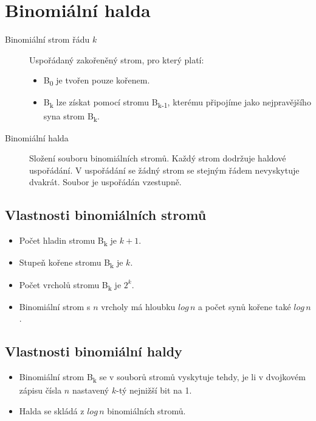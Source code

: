 \section{Binomiální halda}

  \begin{description}
    \item[Binomiální strom řádu $k$] Uspořádaný zakořeněný strom, pro který platí:
    \begin{itemize}
      \item B\textsubscript{0} je tvořen pouze kořenem.
      \item B\textsubscript{k} lze získat pomocí stromu B\textsubscript{k-1}, kterému připojíme jako nejpravějšího syna strom B\textsubscript{k}.
    \end{itemize}
    \item[Binomiální halda] Složení souboru binomiálních stromů. Každý strom dodržuje haldové uspořádání. V uspořádání se žádný strom se stejným řádem nevyskytuje dvakrát. Soubor je uspořádán vzestupně.
  \end{description}

  \subsection{Vlastnosti binomiálních stromů}
    \begin{itemize}
      \item Počet hladin stromu B\textsubscript{k} je $k+1$.
      \item Stupeň kořene stromu B\textsubscript{k} je $k$.
      \item Počet vrcholů stromu B\textsubscript{k} je $2^k$.
      \item Binomiální strom s $n$ vrcholy má hloubku $log \, n$ a počet synů kořene také $log \, n$.
    \end{itemize}

    \subsection{Vlastnosti binomiální haldy}
      \begin{itemize}
        \item Binomiální strom B\textsubscript{k} se v souborů stromů vyskytuje tehdy, je li v dvojkovém zápisu čísla $n$ nastavený $k$-tý nejnižší bit na 1.
        \item Halda se skládá z $log \, n$ binomiálních stromů.
      \end{itemize}

